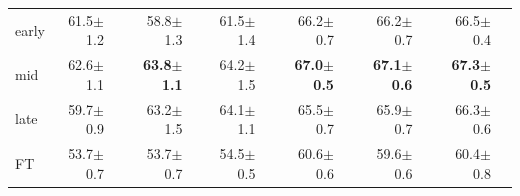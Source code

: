 \begin{tabular}{lrrrrrrrrrrrr}
\midrule
early & 61.5\tiny{$\pm$1.2} &  & 58.8\tiny{$\pm$1.3} &  & 61.5\tiny{$\pm$1.4} &  & 66.2\tiny{$\pm$0.7} &  & 66.2\tiny{$\pm$0.7} &  & 66.5\tiny{$\pm$0.4} &  \\
mid & 62.6\tiny{$\pm$1.1} &  & \textbf{63.8\tiny{$\pm$1.1}} &  & 64.2\tiny{$\pm$1.5} &  & \textbf{67.0\tiny{$\pm$0.5}} &  & \textbf{67.1\tiny{$\pm$0.6}} &  & \textbf{67.3\tiny{$\pm$0.5}} &  \\
late & 59.7\tiny{$\pm$0.9} &  & 63.2\tiny{$\pm$1.5} &  & 64.1\tiny{$\pm$1.1} &  & 65.5\tiny{$\pm$0.7} &  & 65.9\tiny{$\pm$0.7} &  & 66.3\tiny{$\pm$0.6} &  \\
\midrule
FT & 53.7\tiny{$\pm$0.7} &  & 53.7\tiny{$\pm$0.7} &  & 54.5\tiny{$\pm$0.5} &  & 60.6\tiny{$\pm$0.6} &  & 59.6\tiny{$\pm$0.6} &  & 60.4\tiny{$\pm$0.8} &  \\
\bottomrule
\end{tabular}
